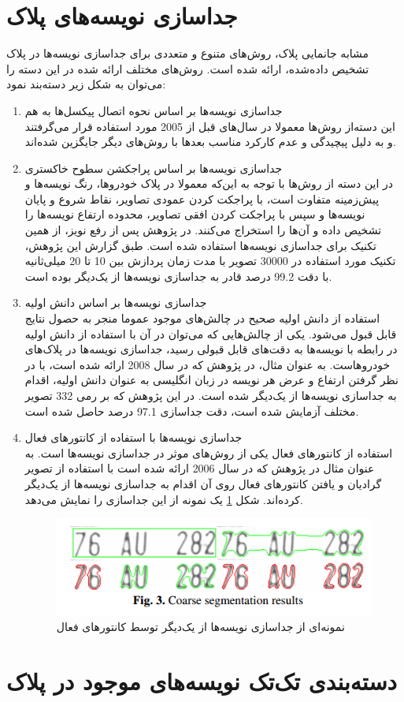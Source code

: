 \documentclass[12pt,a4paper]{article}
\begin{document}
\section{جداسازی نویسه‌های پلاک}
مشابه جانمایی پلاک، روش‌های متنوع و متعددی برای جداسازی نویسه‌ها در پلاک تشخیص‌ داده‌شده، ارائه شده است. روش‌های مختلف ارائه شده در این دسته را می‌توان به شکل زیر دسته‌بند نمود:
\begin{enumerate}
\item جداسازی نویسه‌ها بر اساس نحوه اتصال پیکسل‌ها به هم \\
این دسته‌از روش‌ها معمولا در سال‌های قبل از 2005 مورد استفاده قرار می‌گرفتند و به دلیل پیچیدگی و عدم کارکرد مناسب بعدها با روش‌های دیگر جایگزین شده‌اند.
\item جداسازی نویسه‌ها بر اساس پراجکشن سطوح خاکستری \\
در این دسته از روش‌ها با توجه به این‌که معمولا در پلاک خودروها، رنگ نویسه‌ها و پیش‌زمینه متفاوت است، با پراجکت کردن عمودی تصاویر، نقاط شروع و پایان نویسه‌ها و سپس با پراجکت کردن افقی تصاویر، محدوده ارتفاع نویسه‌ها را تشخیص داده و آن‌ها را استخراج می‌کنند. در پژوهش \cite{sanyuan2004car} پس از رفع نویز، از همین تکنیک برای جداسازی نویسه‌ها استفاده شده است. طبق گزارش این پژوهش، تکنیک مورد استفاده در 30000 تصویر با مدت زمان پردازش بین 10 تا 20 میلی‌ثانیه با دقت 99.2 درصد قادر به جداسازی نویسه‌ها از یک‌دیگر بوده است.
\item جداسازی نویسه‌ها بر اساس دانش اولیه \\
استفاده از دانش اولیه صحیح در چالش‌های موجود عموما منجر به حصول نتایج قابل قبول می‌شود. یکی از چالش‌هایی که می‌توان در آن با استفاده از دانش اولیه در رابطه با نویسه‌ها به دقت‌های قابل قبولی رسید، جداسازی نویسه‌ها در پلاک‌های خودروهاست. به عنوان مثال، در پژوهش \cite{guo2008licence} که در سال 2008 ارائه شده است، با در نظر گرفتن ارتفاع و عرض هر نویسه در زبان انگلیسی به عنوان دانش اولیه، اقدام به جداسازی نویسه‌ها از یک‌دیگر شده است. در این پژوهش که بر رمی 332 تصویر مختلف آزمایش شده است، دقت جداسازی 97.1 درصد حاصل شده است.
\item جداسازی نویسه‌ها با استفاده از کانتورهای فعال \\
استفاده از کانتورهای فعال یکی از روش‌های موثر در جداسازی نویسه‌ها است. به عنوان مثال در پژوهش \cite{capar2006concurrent} که در سال 2006 ارائه شده است با استفاده از تصویر گرادیان و یافتن کانتورهای فعال روی آن اقدام به جداسازی نویسه‌ها از یک‌دیگر کرده‌اند. شکل \ref{fig:seg1} یک نمونه از این جداسازی را نمایش می‌دهد.


\begin{figure}[h]
\centering
\includegraphics[scale=0.5]{Imgs/seg1.png}
\caption{نمونه‌ای از جداسازی نویسه‌ها از یک‌دیگر توسط کانتورهای فعال \cite{capar2006concurrent}}
\label{fig:seg1}
\end{figure}

\end{enumerate}

\section{دسته‌بندی تک‌تک نویسه‌های موجود در پلاک}




\end{document}
